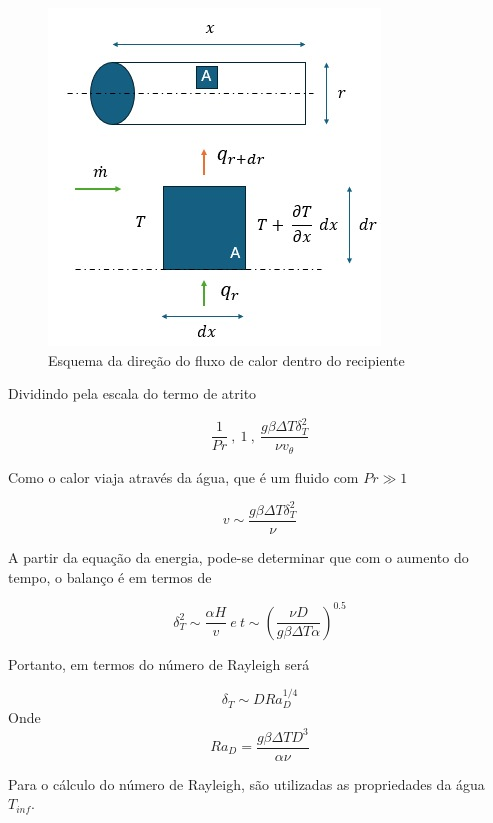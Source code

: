 \documentclass[12pt]{article}
\begin{document}
\begin{figure}[H]
	\centering
	\includegraphics[width=.65\textwidth]{Figures/1_3}
	\caption{Esquema da direção do fluxo de calor dentro do recipiente }
\end{figure}

Dividindo pela escala do termo de atrito

\begin{equation}
	\frac{1}{Pr} \ , \ 1 \ , \ \frac{ g\beta\Delta T \delta_{T}^{2}}{\nu v_{\theta}}
\end{equation}

Como o calor viaja através da água, que é um fluido com $Pr\gg 1$

\begin{equation}
	v \sim \frac{ g\beta\Delta T \delta_{T}^{2}}{\nu }
\end{equation}

A partir da equação da energia, pode-se determinar que com o aumento do tempo, o balanço é em termos de


\begin{equation}
	\delta_{T}^{2}\sim \frac{\alpha H}{v} \ e \ t\sim \left( \frac{\nu D}{g\beta \Delta T \alpha}\right)^{0.5} 
\end{equation}


Portanto, em termos do número de Rayleigh será

\begin{equation}
	\delta_{T}\sim D Ra_{D}^{1/4} 
\end{equation}
Onde
\begin{equation}
	 Ra_{D}=\frac{g\beta\Delta TD^{3}}{\alpha \nu}
\end{equation}

Para o cálculo do número de Rayleigh, são utilizadas as propriedades da água $T_{inf}$.
\end{document}
